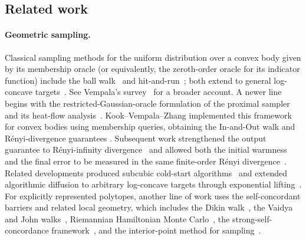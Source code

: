 \documentclass[11pt]{article}
\theoremstyle{definition}
\theoremstyle{remark}
\begin{document}
\subsection{Related work}

\paragraph{Geometric sampling.}
Classical sampling methods for the uniform distribution over a convex body given by its membership oracle (or equivalently, the zeroth-order oracle for its indicator function) include the ball walk~\cite{LS,KLS97} and hit-and-run~\cite{Smith,LovaszHR,LV}; both extend to general log-concave targets~\cite{LVlogconcave}.  See Vempala's survey~\cite{VempalaSurvey} for a broader account. A newer line begins with the restricted-Gaussian-oracle formulation of the proximal sampler~\cite{LeeShenTian21} and its heat-flow analysis~\cite{ChenChewiSalimWibisono22}.  Kook--Vempala--Zhang implemented this framework for convex bodies using membership queries, obtaining the In-and-Out walk and R\'enyi-divergence guarantees \cite{KookVempalaZhangInOut}.  Subsequent work strengthened the output guarantee to R\'enyi-infinity divergence~\cite{KookZhangRenyi} and allowed both the initial warmness and the final error to be measured in the same finite-order R\'enyi divergence~\cite{KookVempalaZerothOrder}.  Related developments produced subcubic cold-start algorithms~\cite{KookVempalaCold} and extended algorithmic diffusion to arbitrary log-concave targets through exponential lifting~\cite{KookVempalaDiffusion,KookVempalaUnified}.
For explicitly represented polytopes, another line of work uses the self-concordant barriers and related local geometry, which includes the Dikin walk~\cite{KannanNarayananDikin,kook2026d25mixingbounddikinwalks}, the Vaidya and John walks~\cite{ChenDwivediWainwrightYu}, Riemannian Hamiltonian Monte Carlo~\cite{LeeVempalaRHMC,RHMCLewis}, the strong-self-concordance framework~\cite{LaddhaLeeVempala}, and the interior-point method for sampling~\cite{kook2024gaussian}.  
\end{document}
